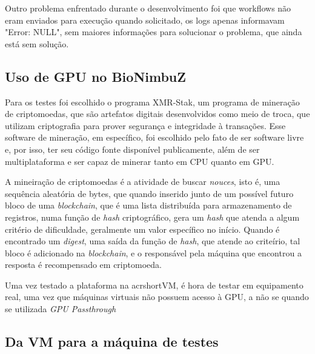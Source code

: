 Outro problema enfrentado durante o desenvolvimento foi que workflows não eram enviados para execução quando solicitado, os logs apenas informavam "Error: NULL", sem maiores informações para solucionar o problema, que ainda está sem solução.

\subsection{Uso de \acrshort{GPU} no BioNimbuZ}

Para os testes foi escolhido o programa XMR-Stak\cite{xmr_stak}, um programa de mineração de criptomoedas, que são artefatos digitais desenvolvidos como meio de troca, que utilizam criptografia para prover segurança e integridade à transações\cite{crypto_currencies}. Esse software de mineração, em específico, foi escolhido pelo fato de ser software livre e, por isso, ter seu código fonte disponível publicamente, além de ser multiplataforma e ser capaz de minerar tanto em CPU quanto em GPU.

A mineiração de criptomoedas é a atividade de buscar \textit{nouces}, isto é, uma sequência aleatória de bytes, que quando inserido junto de um possível futuro bloco de uma \textit{blockchain}, que é uma lista distribuída para armazenamento de registros, numa função de \textit{hash} criptográfico, gera um \textit{hash} que atenda a algum critério de dificuldade, geralmente um valor específico no início. Quando é encontrado um \textit{digest}, uma saída da função de \textit{hash}, que atende ao criteírio, tal bloco é adicionado na \textit{blockchain}, e o responsável pela máquina que encontrou a resposta é recompensado em criptomoeda.

Uma vez testado a plataforma na acrshort{VM}, é hora de testar em equipamento real, uma vez que máquinas virtuais não possuem acesso à \acrshort{GPU}, a não se quando se utilizada \textit{\acrshort{GPU} Passthrough}

\subsection{Da \acrshort{VM} para a máquina de testes}




 


